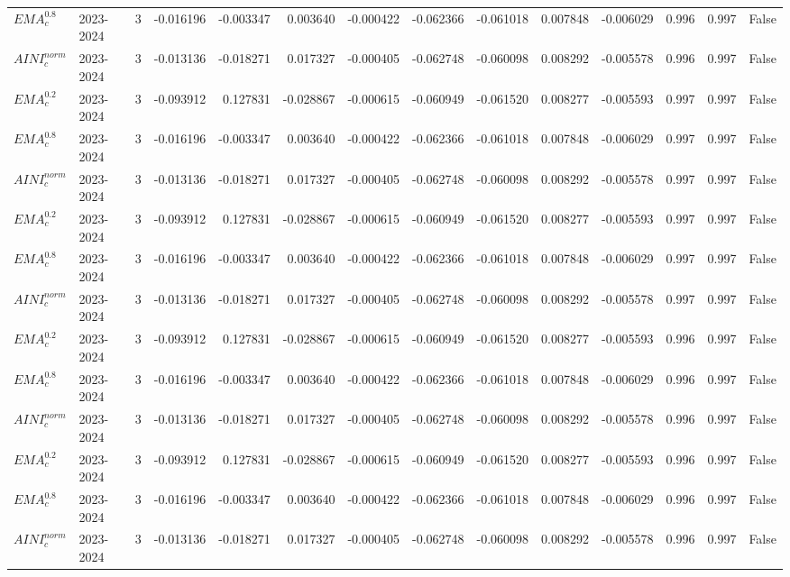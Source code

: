 \begin{tabular}{@{}llrrrrrrrrrlll@{}}
$EMA^{0.8}_{c}$ & 2023-2024 & 3 & -0.016196 & -0.003347 & 0.003640 & -0.000422 & -0.062366 & -0.061018 & 0.007848 & -0.006029 & 0.996 & 0.997 & False \\
$AINI^{norm}_{c}$ & 2023-2024 & 3 & -0.013136 & -0.018271 & 0.017327 & -0.000405 & -0.062748 & -0.060098 & 0.008292 & -0.005578 & 0.996 & 0.997 & False \\
$EMA^{0.2}_{c}$ & 2023-2024 & 3 & -0.093912 & 0.127831 & -0.028867 & -0.000615 & -0.060949 & -0.061520 & 0.008277 & -0.005593 & 0.997 & 0.997 & False \\
$EMA^{0.8}_{c}$ & 2023-2024 & 3 & -0.016196 & -0.003347 & 0.003640 & -0.000422 & -0.062366 & -0.061018 & 0.007848 & -0.006029 & 0.997 & 0.997 & False \\
$AINI^{norm}_{c}$ & 2023-2024 & 3 & -0.013136 & -0.018271 & 0.017327 & -0.000405 & -0.062748 & -0.060098 & 0.008292 & -0.005578 & 0.997 & 0.997 & False \\
$EMA^{0.2}_{c}$ & 2023-2024 & 3 & -0.093912 & 0.127831 & -0.028867 & -0.000615 & -0.060949 & -0.061520 & 0.008277 & -0.005593 & 0.997 & 0.997 & False \\
$EMA^{0.8}_{c}$ & 2023-2024 & 3 & -0.016196 & -0.003347 & 0.003640 & -0.000422 & -0.062366 & -0.061018 & 0.007848 & -0.006029 & 0.997 & 0.997 & False \\
$AINI^{norm}_{c}$ & 2023-2024 & 3 & -0.013136 & -0.018271 & 0.017327 & -0.000405 & -0.062748 & -0.060098 & 0.008292 & -0.005578 & 0.997 & 0.997 & False \\
$EMA^{0.2}_{c}$ & 2023-2024 & 3 & -0.093912 & 0.127831 & -0.028867 & -0.000615 & -0.060949 & -0.061520 & 0.008277 & -0.005593 & 0.996 & 0.997 & False \\
$EMA^{0.8}_{c}$ & 2023-2024 & 3 & -0.016196 & -0.003347 & 0.003640 & -0.000422 & -0.062366 & -0.061018 & 0.007848 & -0.006029 & 0.996 & 0.997 & False \\
$AINI^{norm}_{c}$ & 2023-2024 & 3 & -0.013136 & -0.018271 & 0.017327 & -0.000405 & -0.062748 & -0.060098 & 0.008292 & -0.005578 & 0.996 & 0.997 & False \\
$EMA^{0.2}_{c}$ & 2023-2024 & 3 & -0.093912 & 0.127831 & -0.028867 & -0.000615 & -0.060949 & -0.061520 & 0.008277 & -0.005593 & 0.996 & 0.997 & False \\
$EMA^{0.8}_{c}$ & 2023-2024 & 3 & -0.016196 & -0.003347 & 0.003640 & -0.000422 & -0.062366 & -0.061018 & 0.007848 & -0.006029 & 0.996 & 0.997 & False \\
$AINI^{norm}_{c}$ & 2023-2024 & 3 & -0.013136 & -0.018271 & 0.017327 & -0.000405 & -0.062748 & -0.060098 & 0.008292 & -0.005578 & 0.996 & 0.997 & False \\

\end{tabular}
